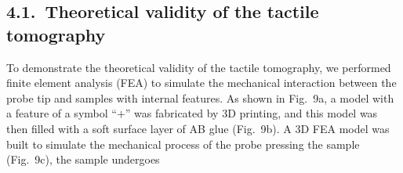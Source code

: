 \documentclass[11pt]{article}
\begin{document}
\subsection*{4.1.\ Theoretical validity of the tactile tomography}

To demonstrate the theoretical validity of the tactile tomography,
we performed finite element analysis (FEA) to simulate the
mechanical interaction between the probe tip and samples with
internal features. As shown in Fig.~9a, a model with a feature of a
symbol ``$+$'' was fabricated by 3D printing, and this model was
then filled with a soft surface layer of AB glue (Fig.~9b). A 3D
FEA model was built to simulate the mechanical process of the probe
pressing the sample (Fig.~9c), the sample undergoes
\end{document}
